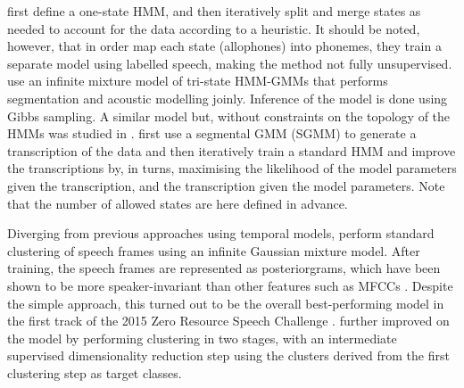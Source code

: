 \textcite{varadarajan2008unsupervised} first define a one-state HMM, and then iteratively split and merge states as needed to account for the data according to a heuristic.
It should be noted, however, that in order map each state (allophones) into phonemes, they train a separate model using labelled speech, making the method not fully unsupervised.
\textcite{lee2012nonparametric} use an infinite mixture model of tri-state HMM-GMMs that performs segmentation and acoustic modelling joinly.
Inference of the model is done using Gibbs sampling.
A similar model but, without constraints on the topology of the HMMs was studied in \parencite{gs:VanhainenAndSalvi2014ICASSP}.
\textcite{siu2014unsupervised} first use a segmental GMM (SGMM) to generate a transcription of the data and then iteratively train a standard HMM and improve the transcriptions by, in turns, maximising the likelihood of the model parameters given the transcription, and the transcription given the model parameters.
Note that the number of allowed states are here defined in advance.

Diverging from previous approaches using temporal models, \textcite{chen2015parallel} perform standard clustering of speech frames using an infinite Gaussian mixture model.
After training, the speech frames are represented as posteriorgrams, which have been shown to be more speaker-invariant than other features such as MFCCs \parencite{zhang2010towards}.
Despite the simple approach, this turned out to be the overall best-performing model in the first track of the 2015 Zero Resource Speech Challenge \parencite{versteegh2016zero}.
\textcite{heck2016unsupervised} further improved on the model by performing clustering in two stages, with an intermediate supervised dimensionality reduction step using the clusters derived from the first clustering step as target classes.

